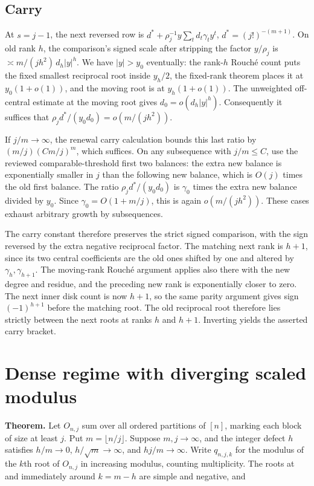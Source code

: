\documentclass[11pt]{article}
\begin{document}
\subsection{Carry}
\label{sec:carry}

At \(s=j-1\), the next reversed row is \(d^*+\rho_j^{-1} y\sum_t d_t\gamma_t y^t\), \(d^*=(j!)^{-(m+1)}\). On old rank \(h\), the comparison's signed scale after stripping the factor \(y/\rho_j\) is \(\asymp m/(jh^2)\,d_h|y|^h\). We have \(|y|>y_0\) eventually: the rank-\(h\) Rouché count puts the fixed smallest reciprocal root inside \(y_h/2\), the fixed-rank theorem places it at \(y_0(1+o(1))\), and the moving root is at \(y_h(1+o(1))\). The unweighted off-central estimate at the moving root gives \(d_0=o(d_h|y|^h)\). Consequently it suffices that \(\rho_j d^*/(y_0d_0)=o(m/(jh^2))\).

If \(j/m\to\infty\), the renewal carry calculation bounds this last ratio by \((m/j)(C m/j)^m\), which suffices. On any subsequence with \(j/m\le C\), use the reviewed comparable-threshold first two balances: the extra new balance is exponentially smaller in \(j\) than the following new balance, which is \(O(j)\) times the old first balance. The ratio \(\rho_j d^*/(y_0 d_0)\) is \(\gamma_0\) times the extra new balance divided by \(y_0\). Since \(\gamma_0=O(1+m/j)\), this is again \(o(m/(jh^2))\). These cases exhaust arbitrary growth by subsequences.

The carry constant therefore preserves the strict signed comparison, with the sign reversed by the extra negative reciprocal factor. The matching next rank is \(h+1\), since its two central coefficients are the old ones shifted by one and altered by \(\gamma_h,\gamma_{h+1}\). The moving-rank Rouché argument applies also there with the new degree and residue, and the preceding new rank is exponentially closer to zero. The next inner disk count is now \(h+1\), so the same parity argument gives sign \((-1)^{h+1}\) before the matching root. The old reciprocal root therefore lies strictly between the next roots at ranks \(h\) and \(h+1\). Inverting yields the asserted carry bracket.

\section{Dense regime with diverging scaled modulus}
\label{sec:moving-poles}

\textbf{Theorem.} Let \(O_{n,j}\) sum over all ordered partitions of \([n]\), marking each block of size at least \(j\). Put \(m=\lfloor n/j\rfloor\). Suppose \(m,j\to\infty\), and the integer defect \(h\) satisfies \(h/m\to0\), \(h/\sqrt m\to\infty\), and \(hj/m\to\infty\). Write \(q_{n,j,k}\) for the modulus of the \(k\)th root of \(O_{n,j}\) in increasing modulus, counting multiplicity. The roots at and immediately around \(k=m-h\) are simple and negative, and
\end{document}
